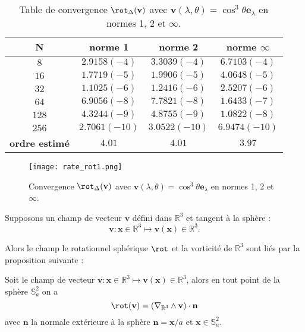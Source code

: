 \begin{table}[htbp]
\begin{center}
\begin{tabular}{|c||c|c|c|}
\hline
\textbf{N}  & \textbf{norme 1} & \textbf{norme 2} & \textbf{norme $\infty$} \\
\hline
\hline
$8$  & $2.9158(-4)$  & $3.3039(-4)$  & $6.7103(-4)$  \\
$16$ & $1.7719(-5)$  & $1.9906(-5)$  & $4.0648(-5)$  \\
$32$ & $1.1025(-6)$  & $1.2416(-6)$  & $2.5207(-6)$  \\
$64$ & $6.9056(-8)$  & $7.7821(-8)$  & $1.6433(-7)$  \\
$128$& $4.3244(-9)$  & $4.8755(-9)$  & $1.0822(-8)$  \\
$256$& $2.7061(-10)$ & $3.0522(-10)$ & $6.9474(-10)$ \\
\hline 
\hline
\textbf{ordre estimé}& $4.01$ & $4.01$ & $3.97$\\
\hline
\end{tabular}
\end{center}
\caption{Table de convergence $\rot_{\Delta} ( \mathbf{v} )$ avec $\mathbf{v} ( \lambda, \theta ) = \cos^3 \theta \mathbf{e}_{\lambda}$ en normes 1, 2 et $\infty$.}
\label{tab:rate_rot1}
\end{table} 

\begin{figure}[htbp]
\begin{center}
\texttt{[image: rate\_rot1.png]}
\end{center}
\caption{Convergence $\rot_{\Delta} ( \mathbf{v} )$ avec $\mathbf{v} ( \lambda, \theta ) = \cos^3 \theta \mathbf{e}_{\lambda}$ en normes 1, 2 et $\infty$.}
\label{fig:rate_rot1}
\end{figure}


Supposons un champ de vecteur $\mathbf{v}$ défini dans $\mathbb{R}^3$ et tangent à la sphère :
\begin{equation}
\mathbf{v} : \mathbf{x} \in \mathbb{R}^3 \mapsto \mathbf{v}(\mathbf{x}) \in \mathbb{R}^3.
\end{equation}

Alors le champ le rotationnel sphérique $\rot$ et la vorticité de $\mathbb{R}^3$ sont liés par la proposition suivante :

\begin{proposition}
Soit le champ de vecteur $\mathbf{v} : \mathbf{x} \in \mathbb{R}^3 \mapsto \mathbf{v}(\mathbf{x}) \in \mathbb{R}^3$, alors en tout point de la sphère $\mathbb{S}_a^2$ on a
\begin{equation}
\rot (\mathbf{v} ) = \left( \nabla_{\mathbb{R}^3} \wedge \mathbf{v} \right) \cdot \mathbf{n}
\end{equation}
avec $\mathbf{n}$ la normale extérieure à la sphère $\mathbf{n} = \mathbf{x}/a$ et $\mathbf{x} \in \mathbb{S}_a^2$.
\end{proposition}

